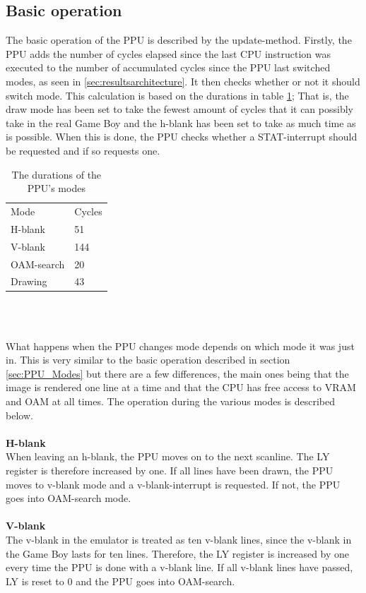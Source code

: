 \subsection{Basic operation}
The basic operation of the PPU is described by the update-method. Firstly, the PPU adds the number of cycles elapsed since the last CPU instruction was executed to the number of accumulated cycles since the PPU last switched modes, as seen in \ref{sec:resultsarchitecture}. It then checks whether or not it should switch mode. This calculation is based on the durations in table \ref{tab:PPU_mode_durations}; That is, the draw mode has been set to take the fewest amount of cycles that it can possibly take in the real Game Boy and the h-blank has been set to take as much time as is possible. When this is done, the PPU checks whether a STAT-interrupt should be requested and if so requests one.
\begin{table}[H]
    \centering
\begin{tabular}{l|l}
    Mode & Cycles \\
    H-blank & 51\\
    V-blank & 144\\
    OAM-search & 20\\
    Drawing & 43
\end{tabular}
\\\
    \caption{The durations of the PPU's modes}
    \label{tab:PPU_mode_durations}
\end{table}
What happens when the PPU changes mode depends on which mode it was just in. This is very similar to the basic operation described in section \ref{sec:PPU_Modes} but there are a few differences, the main ones being that the image is rendered one line at a time and that the CPU has free access to VRAM and OAM at all times. The operation during the various modes is described below.\\
\\
\textbf{H-blank}\\
When leaving an h-blank, the PPU moves on to the next scanline. The LY register is therefore increased by one. If all lines have been drawn, the PPU moves to v-blank mode and a v-blank-interrupt is requested. If not, the PPU goes into OAM-search mode.\\
\\
\textbf{V-blank}\\
The v-blank in the emulator is treated as ten v-blank lines, since the v-blank in the Game Boy lasts for ten lines. Therefore, the LY register is increased by one every time the PPU is done with a v-blank line. If all v-blank lines have passed, LY is reset to 0 and the PPU goes into OAM-search.\\
